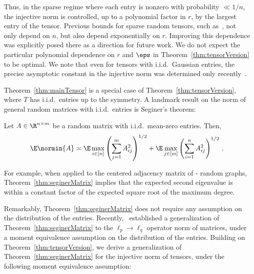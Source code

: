 \documentclass[11pt,a4paper]{article}
\begin{document}
Thus, in the sparse regime where each
entry is nonzero with probability $\ll 1/n$, the
injective norm is controlled, up to a polynomial factor in $r$, by the largest entry of the tensor.
Previous bounds for sparse random tensors, such as~\cite{sparseTensorZhou}, not only depend on $n$, but also depend exponentially on $r$. Improving this dependence was explicitly posed
there as a direction for future work. 
We do not expect the particular
polynomial dependence on $r$ and $\eps$ in Theorem~\ref{thm:tensorVersion} to be optimal.
We note that even for tensors with i.i.d.\ Gaussian entries, the precise asymptotic constant in the injective norm was determined only recently~\cite{2024DartoisMcKenna,bates2025balanced}.

Theorem~\ref{thm:mainTensor} 
is a special case of Theorem~\ref{thm:tensorVersion}, where $T$ has
i.i.d.\ entries up to the symmetry. A landmark result on the
norm of general random matrices with
i.i.d.\ entries is Seginer's theorem:

\begin{theorem}\label{thm:seginerMatrix}
    Let $A\in \R^{n\times m}$ 
    be a random matrix with
    i.i.d.\ mean-zero entries. Then,
    \[
        \E \normin{A} \asymp \E \max_{i\in [n]} \left(\sum_{j=1}^m A_{ij}^2\right)^{1/2} + \E \max_{j\in [m]} \left(\sum_{i=1}^n A_{ij}^2\right)^{1/2}\,.
    \]
\end{theorem}

\noindent For example, when 
applied to the centered adjacency matrix of \Erdos-\Renyi
random graphs, 
Theorem~\ref{thm:seginerMatrix} implies that the expected second eigenvalue is within a constant factor of the expected square root of the maximum degree.

Remarkably, Theorem~\ref{thm:seginerMatrix}
does not require any assumption
on the distribution of the entries. Recently,~\cite{latala2025operator} established a generalization of Theorem~\ref{thm:seginerMatrix} to the $\ell_p \to \ell_q$ operator norm of matrices, under a moment equivalence assumption on the distribution of the entries.
Building on Theorem~\ref{thm:tensorVersion}, we derive a generalization of
Theorem~\ref{thm:seginerMatrix}
for the injective norm of tensors, under the following moment equivalence assumption:
\end{document}
